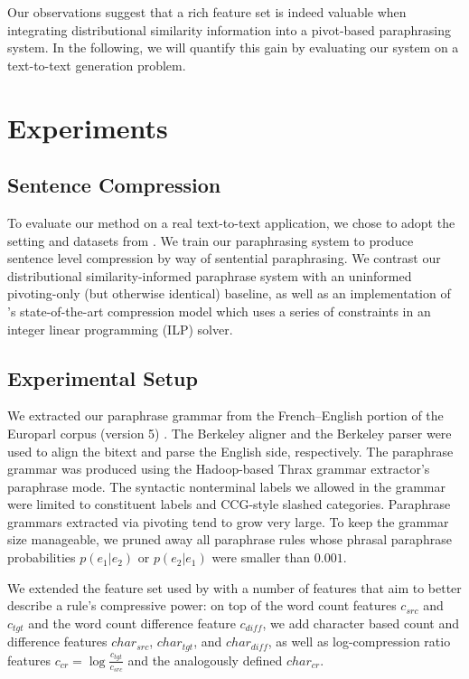 \documentclass[11pt]{article}
\begin{document}
Our observations suggest that a rich feature set is indeed valuable
when integrating distributional similarity information into a
pivot-based paraphrasing system. In the following, we will quantify
this gain by evaluating our system on a text-to-text generation
problem.



\section{Experiments}
\label{sec-results}

\subsection{Sentence Compression}

To evaluate our method on a real text-to-text application, we chose to
adopt the setting and datasets from \cite{Ganitkevitch2011}. We train
our paraphrasing system to produce sentence level compression by way
of sentential paraphrasing. We contrast our distributional
similarity-informed paraphrase system with an uninformed pivoting-only
(but otherwise identical) baseline, as well as an implementation of
's state-of-the-art compression model which uses a
series of constraints in an integer linear programming (ILP)
solver.

\subsection{Experimental Setup}
\label{sec-setup}

We extracted our paraphrase grammar from the French--English portion
of the Europarl corpus (version 5) \cite{koehn2005europarl}. The
Berkeley aligner and the Berkeley parser were used to align the bitext
and parse the English side, respectively. The paraphrase grammar was
produced using the Hadoop-based Thrax grammar extractor's paraphrase
mode. The syntactic nonterminal labels we allowed in the grammar were
limited to constituent labels and CCG-style slashed
categories. Paraphrase grammars extracted via pivoting tend to grow
very large. To keep the grammar size manageable, we pruned away all
paraphrase rules whose phrasal paraphrase probabilities $p(e_1|e_2)$
or $p(e_2|e_1)$ were smaller than $0.001$.

We extended the feature set used by  with a
number of features that aim to better describe a rule's compressive
power: on top of the word count features $c_{\mathit{src}}$ and
$c_{\mathit{tgt}}$ and the word count difference feature
$c_{\mathit{diff}}$, we add character based count and difference
features $\mathit{char}_{\mathit{src}}$,
$\mathit{char}_{\mathit{tgt}}$, and $\mathit{char}_{\mathit{diff}}$,
as well as log-compression ratio features $c_{\mathit{cr}} = \log
\frac{c_{\mathit{tgt}}}{c_{\mathit{src}}}$ and the analogously defined
$\mathit{char}_{\mathit{cr}}$.
\end{document}
